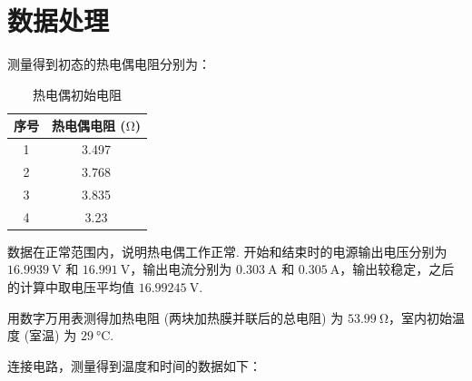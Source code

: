\documentclass{customDoc}
\begin{document}
\section{数据处理}

测量得到初态的热电偶电阻分别为：

\begin{table}[H]
  \centering
  \caption{热电偶初始电阻}
    \begin{tabular}{|c|c|}
    \hline
    序号    & 热电偶电阻 ($\si{\ohm}$) \\
    \hline
    1     & 3.497 \\
    \hline
    2     & 3.768 \\
    \hline
    3     & 3.835 \\
    \hline
    4     & 3.23 \\
    \hline
    \end{tabular}
  \label{tab:1}%
\end{table}

数据在正常范围内，说明热电偶工作正常. 开始和结束时的电源输出电压分别为 $\SI{16.9939}{\volt}$ 和 $\SI{16.991}{\volt}$，输出电流分别为 $\SI{0.303}{\ampere}$ 和 $\SI{0.305}{\ampere}$，输出较稳定，之后的计算中取电压平均值 $\SI{16.99245}{\volt}$.

用数字万用表测得加热电阻 (两块加热膜并联后的总电阻) 为 $\SI{53.99}{\ohm}$，室内初始温度 (室温) 为 $\SI{29}{\degreeCelsius}$.

连接电路，测量得到温度和时间的数据如下：
\end{document}
